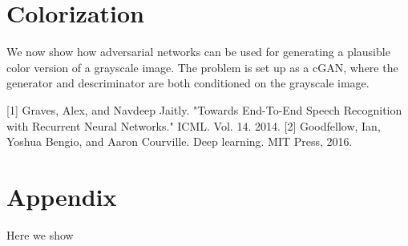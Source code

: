 \documentclass{article}
\begin{document}
\section{Colorization}
We now show how adversarial networks can be used for generating a plausible color version of a grayscale image.
The problem is set up as a cGAN, where the generator and descriminator are both conditioned on the grayscale image.







[1] Graves, Alex, and Navdeep Jaitly. "Towards End-To-End Speech Recognition with Recurrent Neural Networks." ICML. Vol. 14. 2014.
[2] Goodfellow, Ian, Yoshua Bengio, and Aaron Courville. Deep learning. MIT Press, 2016.


\appendix

\section{Appendix}
Here we show 
\end{document}
